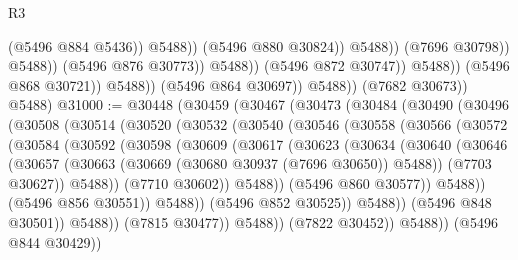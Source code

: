 \begin{lexlean}{R3}
\begin{coremodule}
                                                  (@5496 @884 @5436))
                                                @5488))
                                            (@5496 @880 @30824))
                                          @5488))
                                      (@7696 @30798))
                                    @5488))
                                (@5496 @876 @30773))
                              @5488))
                          (@5496 @872 @30747))
                        @5488))
                    (@5496 @868 @30721))
                  @5488))
              (@5496 @864 @30697))
            @5488))
        (@7682 @30673))
      @5488)
@31000 := @30448
    (@30459
      (@30467
        (@30473
          (@30484
            (@30490
              (@30496
                (@30508
                  (@30514
                    (@30520
                      (@30532
                        (@30540
                          (@30546
                            (@30558
                              (@30566
                                (@30572
                                  (@30584
                                    (@30592
                                      (@30598
                                        (@30609
                                          (@30617
                                            (@30623
                                              (@30634
                                                (@30640
                                                  (@30646
                                                    (@30657
                                                      (@30663
                                                        (@30669
                                                          (@30680 @30937 (@7696 @30650))
                                                          @5488))
                                                      (@7703 @30627))
                                                    @5488))
                                                (@7710 @30602))
                                              @5488))
                                          (@5496 @860 @30577))
                                        @5488))
                                    (@5496 @856 @30551))
                                  @5488))
                              (@5496 @852 @30525))
                            @5488))
                        (@5496 @848 @30501))
                      @5488))
                  (@7815 @30477))
                @5488))
            (@7822 @30452))
          @5488))
      (@5496 @844 @30429))

\end{coremodule}
\end{lexlean}
